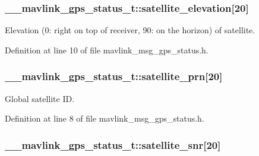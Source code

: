 \hypertarget{struct____mavlink__gps__status__t_aa0df643ba0353ad8affab5768675b9ea}{
\subsubsection[{satellite\-\_\-elevation}]{ \-\_\-\-\_\-mavlink\-\_\-gps\-\_\-status\-\_\-t\-::satellite\-\_\-elevation\mbox{[}20\mbox{]}}}\label{struct____mavlink__gps__status__t_aa0df643ba0353ad8affab5768675b9ea}


Elevation (0\-: right on top of receiver, 90\-: on the horizon) of satellite. 



Definition at line 10 of file mavlink\-\_\-msg\-\_\-gps\-\_\-status.\-h.

\hypertarget{struct____mavlink__gps__status__t_a1a615b66354df8f0bfb0c269251b1f21}{
\subsubsection[{satellite\-\_\-prn}]{ \-\_\-\-\_\-mavlink\-\_\-gps\-\_\-status\-\_\-t\-::satellite\-\_\-prn\mbox{[}20\mbox{]}}}\label{struct____mavlink__gps__status__t_a1a615b66354df8f0bfb0c269251b1f21}


Global satellite I\-D. 



Definition at line 8 of file mavlink\-\_\-msg\-\_\-gps\-\_\-status.\-h.

\hypertarget{struct____mavlink__gps__status__t_ab2fd8b1564a9ff56248448f6744f6f0e}{
\subsubsection[{satellite\-\_\-snr}]{ \-\_\-\-\_\-mavlink\-\_\-gps\-\_\-status\-\_\-t\-::satellite\-\_\-snr\mbox{[}20\mbox{]}}}\label{struct____mavlink__gps__status__t_ab2fd8b1564a9ff56248448f6744f6f0e}


